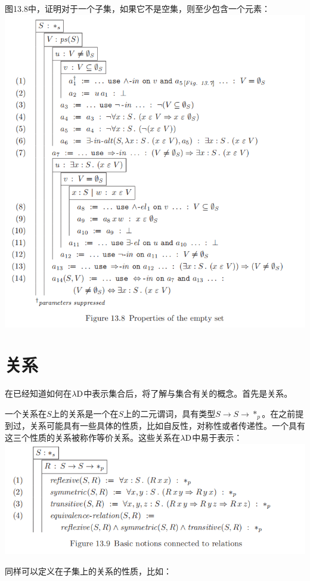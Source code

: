 \documentclass[UTF8]{article}
\begin{document}
		图13.8中，证明对于一个子集，如果它不是空集，则至少包含一个元素：\\
		\includegraphics[width=0.93\linewidth]{"../imgs/13-7.png"}
		
	\section{关系}
	\noindent
	在已经知道如何在$\lambda{\rm D}$中表示集合后，将了解与集合有关的概念。首先是关系。
	
		一个关系在$S$上的关系是一个在$S$上的二元谓词，具有类型$S\rightarrow S\rightarrow *_p$。在之前提到过，关系可能具有一些具体的性质，比如自反性，对称性或者传递性。一个具有这三个性质的关系被称作等价关系。这些关系在$\lambda{\rm D}$中易于表示：\\
		\includegraphics[width=0.93\linewidth]{"../imgs/13-8.png"}
		
		同样可以定义在子集上的关系的性质，比如：
		
\end{document}

